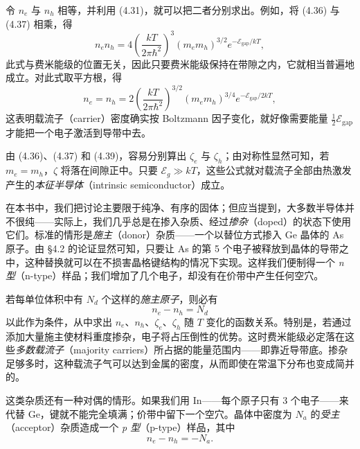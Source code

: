 令 $n_e$ 与 $n_h$ 相等，并利用 (4.31)，就可以把二者分别求出。例如，将 (4.36) 与 (4.37) 相乘，得
\begin{equation*}
n_e n_h = 4\left(\frac{kT}{2\pi\hbar^2}\right)^3 (m_e m_h)^{3/2} e^{-\mathcal{E}_{\mathrm{gap}}/kT},
\tag{4.38}
\end{equation*}
此式与费米能级的位置无关，因此只要费米能级保持在带隙之内，它就相当普遍地成立。对此式取平方根，得
\begin{equation*}
n_e = n_h = 2\left(\frac{kT}{2\pi\hbar^2}\right)^{3/2}(m_e m_h)^{3/4} e^{-\mathcal{E}_{\mathrm{gap}}/2kT},
\tag{4.39}
\end{equation*}
这表明载流子（carrier）密度确实按 Boltzmann 因子变化，就好像需要能量 $\frac{1}{2}\mathcal{E}_{\mathrm{gap}}$ 才能把一个电子激活到导带中去。

由 (4.36)、(4.37) 和 (4.39)，容易分别算出 $\zeta_e$ 与 $\zeta_h$；由对称性显然可知，若 $m_e=m_h$，$\zeta$ 将落在间隙正中。只要 $\mathcal{E}_g\gg kT$，这些公式就对载流子全部由热激发产生的\emph{本征半导体}（intrinsic semiconductor）成立。

在本书中，我们把讨论主要限于纯净、有序的固体；但应当提到，大多数半导体并不很纯——实际上，我们几乎总是在掺入杂质、经过\emph{掺杂}（doped）的状态下使用它们。标准的情形是\emph{施主}（donor）杂质——一个以替位方式掺入 Ge 晶体的 As 原子。由 §4.2 的论证显然可知，只要让 As 的第 5 个电子被释放到晶体的导带之中，这种替换就可以在不损害晶格键结构的情况下实现。这样我们便制得一个 \emph{n 型}（n-type）样品；我们增加了几个电子，却没有在价带中产生任何空穴。

若每单位体积中有 $N_d$ 个这样的\emph{施主原子}，则必有
\begin{equation*}
n_e - n_h = N_d
\tag{4.40}
\end{equation*}
以此作为条件，从中求出 $n_e$、$n_h$、$\zeta_e$、$\zeta_h$ 随 $T$ 变化的函数关系。特别是，若通过添加大量施主使材料重度掺杂，电子将占压倒性的优势。这时费米能级必定落在这些\emph{多数载流子}（majority carriers）所占据的能量范围内——即靠近导带底。掺杂足够多时，这种载流子气可以达到金属的密度，从而即使在常温下分布也变成简并的。


这类杂质还有一种对偶的情形。如果我们用 In——每个原子只有 3 个电子——来代替 Ge，键就不能完全填满；价带中留下一个空穴。晶体中密度为 $N_a$ 的\emph{受主}（acceptor）杂质造成一个 \emph{p 型}（p-type）样品，其中
\begin{equation*}
n_e - n_h = -N_a.
\tag{4.41}
\end{equation*}

